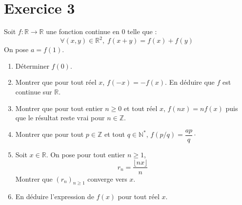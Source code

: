 \documentclass[a4paper,french,11pt,twoside]{VcCours}
\begin{document}
\section*{Exercice 3}
Soit $f : \mathbb{R} \rightarrow \mathbb{R}$ une fonction continue en $0$ telle que :
$$ \forall (x,y) \in \mathbb{R}^2, \; f(x+y)=f(x)+f(y) $$
On pose $a=f(1)$.

\begin{enumerate}
\item Déterminer $f(0)$.
\item Montrer que pour tout réel $x$, $f(-x)=-f(x)$. En déduire que $f$ est 
continue sur $\mathbb{R}$.
\item Montrer que pour tout entier $n \geq 0$ et tout réel $x$, $f(nx)=nf(x)$ 
puis que le résultat reste vrai pour $n \in \mathbb{Z}$.
\item Montrer que pour tout $p \in \mathbb{Z}$ et tout $q \in \mathbb{N}^*$, 
$f(p/q) = \dfrac{ap}{q}\cdot$
\item Soit $x \in \mathbb{R}$. On pose pour tout entier $n \geq 1$,
$$ r_n = \dfrac{\lfloor nx \rfloor}{n}$$
Montrer que $(r_n)_{n \geq 1}$ converge vers $x$.
\item En déduire l'expression de $f(x)$ pour tout réel $x$. 
\end{enumerate}
\end{document}

